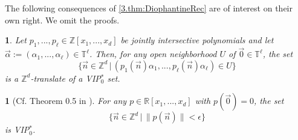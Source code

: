 \documentclass[11pt,american,preprint]{elsarticle}
\numberwithin{equation}{section}
\theoremstyle{plain}
\theoremstyle{plain*}
\theoremstyle{plain}
\theoremstyle{plain*}
\theoremstyle{plain}
\theoremstyle{plain*}
\theoremstyle{remark}
\theoremstyle{remark*}
\theoremstyle{remark}
\theoremstyle{remark*}
\theoremstyle{remark}
\theoremstyle{remark*}
\theoremstyle{plain}
\newtheorem{cor}[thm]{\protect\corollaryname}
\providecommand{\corollaryname}{Corollary}
\theoremstyle{definition}
\theoremstyle{plain}
\theoremstyle{plain} %
\newcommand{\R}{\mathbb{R}}
\newcommand{\Z}{\mathbb{Z}}
\begin{document}
The following consequences of \cref{3.thm:DiophantineRec} are of interest on their own right. We omit the proofs.
\begin{cor}
    Let $p_1,...,p_\ell\in\Z[x_1,...,x_d]$ be jointly intersective polynomials and let $\vec \alpha:=(\alpha_1,...,\alpha_\ell)\in \mathbb T^\ell$. Then, for any open neighborhood $U$ of $\vec 0\in \mathbb T^\ell$, the set \
    $$
\{\vec n\in\Z^d\,|\,(p_1(\vec n)\alpha_1,...,p_\ell(\vec n)\alpha_\ell)\in U\}
    $$
    is a $\Z^d$-translate of a {\rm VIP$_0^*$} set.
\end{cor}
\begin{cor}[Cf. Theorem 0.5 in \cite{BerLeibNilsystemsIPr} ]
    For any $p\in\R[x_1,...,x_d]$ with $p(\vec 0)=0$, the set 
    $$
\{\vec n\in\Z^d\,|\,\|p(\vec n)\|<\epsilon \}
    $$
    is {\rm VIP$_0^*$}. 
\end{cor}
\end{document}
